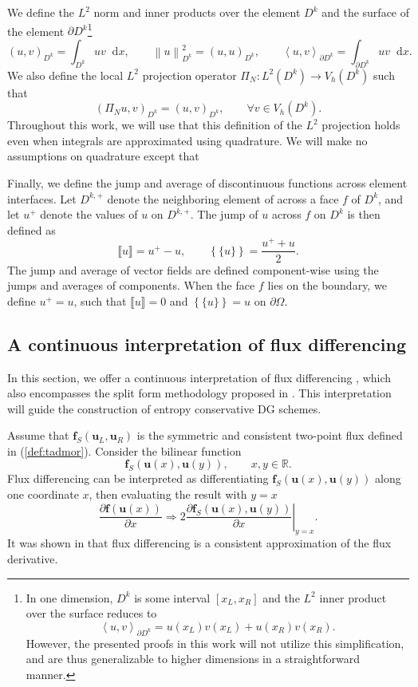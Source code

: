 \documentclass[preprint,10pt]{article}
\theoremstyle{definition}
\theoremstyle{lemma}
\theoremstyle{theorem}
\theoremstyle{assumption}
\newcommand{\pd}[2]{\frac{\partial#1}{\partial#2}}
\newcommand{\nor}[1]{\left\| #1 \right\|}
\newcommand{\LRp}[1]{\left( #1 \right)}
\newcommand{\LRa}[1]{\left\langle #1 \right\rangle}
\newcommand{\LRc}[1]{\left\{ #1 \right\}}
\newcommand{\jump}[1] {\ensuremath{\llbracket#1\rrbracket}}
\newcommand{\avg}[1] {\ensuremath{\LRc{\!\{#1\}\!}}}
\newcommand{\note}[1]{{\color{blue}{#1}}}
\newcommand*\diff[1]{\mathop{}\!{\mathrm{d}#1}}
\begin{document}
We define the $L^2$ norm and inner products over the element $D^k$ and the surface of the element $\partial D^k$\footnote{In one dimension, $D^k$ is some interval $[x_L,x_R]$ and the $L^2$ inner product over the surface reduces to 
\[
\LRa{u,v}_{\partial D^k} = u(x_L)v(x_L) + u(x_R)v(x_R).
\]
However, the presented proofs in this work will not utilize this simplification, and are thus generalizable to higher dimensions in a straightforward manner.}
\[
\LRp{u,v}_{D^k} = \int_{D^k} u v\diff{x}, \qquad \nor{u}^2_{D^k} = (u,u)_{D^k}, \qquad \LRa{u,v}_{\partial D^k} = \int_{\partial D^k} u v \diff{x}.
\]
We also define the local $L^2$ projection operator $\Pi_N: L^2(D^k)\rightarrow V_h(D^k)$ such that
\[
\LRp{\Pi_N u,v}_{D^k} = \LRp{u,v}_{D^k}, \qquad \forall v\in V_h\LRp{D^k}.  
\]
Throughout this work, we will use that this definition of the $L^2$ projection holds even when integrals are approximated using quadrature.  We will make no assumptions on quadrature except that \note{specify assumptions - integrate polynomials of degree $N$ on the reference element exactly, such that integration by parts holds.  Add footnote that we can also generalize to the under-integrated case.  }


Finally, we define the jump and average of discontinuous functions across element interfaces.  Let $D^{k,+}$ denote the neighboring element of across a face $f$ of $D^k$, and let $u^+$ denote the values of $u$ on $D^{k,+}$.  The jump of $u$ across $f$ on $D^k$ is then defined as
\[
\jump{u} = u^+ - u, \qquad \avg{u} = \frac{u^+ + u}{2}.
\]
The jump and average of vector fields are defined component-wise using the jumps and averages of components.  When the face $f$ lies on the boundary, we define $u^+ = u$, such that $\jump{u} = 0$ and $\avg{u} = u$ on $\partial \Omega$.


\subsection{A continuous interpretation of flux differencing}

In this section, we offer a continuous interpretation of flux differencing \cite{fisher2013high,gassner2017br1,chen2017entropy}, which also encompasses the split form methodology proposed in \cite{gassner2016split}.  This interpretation will guide the construction of entropy conservative DG schemes.  

Assume that $\bm{f}_S(\bm{u}_L,\bm{u}_R)$ is the symmetric and consistent two-point flux defined in (\ref{def:tadmor}).  Consider the bilinear function
\[
\bm{f}_S\LRp{\bm{u}(x),\bm{u}(y)}, \qquad x, y \in \mathbb{R}.  
\]
Flux differencing can be interpreted as differentiating $\bm{f}_S\LRp{\bm{u}(x),\bm{u}(y)}$ along one coordinate $x$, then evaluating the result with $y=x$
\begin{equation}
\pd{\bm{f}(\bm{u}(x))}{x} \Longrightarrow 2\left.\pd{\bm{f}_S\LRp{\bm{u}(x),\bm{u}(y)}}{x}\right|_{y=x}.
\label{eq:fluxdiff}
\end{equation}
It was shown in \cite{chen2017entropy} that flux differencing is a consistent approximation of the flux derivative.  
\end{document}
